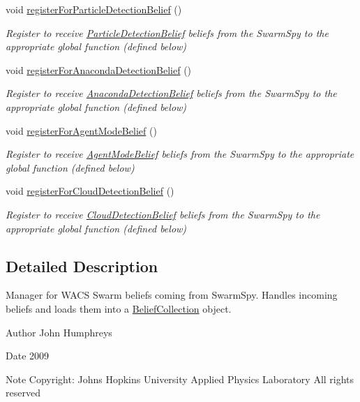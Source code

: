 \begin{DoxyCompactItemize}
void \hyperlink{class_swarm_spy_handler_ad078a719f458b35687f39b3ab64f426f}{registerForParticleDetectionBelief} ()
\begin{DoxyCompactList}\small\item\em Register to receive \hyperlink{class_particle_detection_belief}{ParticleDetectionBelief} beliefs from the SwarmSpy to the appropriate global function (defined below) \end{DoxyCompactList}\item 
void \hyperlink{class_swarm_spy_handler_aae9ba5945d62803409399fe491c925fb}{registerForAnacondaDetectionBelief} ()
\begin{DoxyCompactList}\small\item\em Register to receive \hyperlink{class_anaconda_detection_belief}{AnacondaDetectionBelief} beliefs from the SwarmSpy to the appropriate global function (defined below) \end{DoxyCompactList}\item 
void \hyperlink{class_swarm_spy_handler_a3244d08deb26b669f34333ccbdd4eac3}{registerForAgentModeBelief} ()
\begin{DoxyCompactList}\small\item\em Register to receive \hyperlink{class_agent_mode_belief}{AgentModeBelief} beliefs from the SwarmSpy to the appropriate global function (defined below) \end{DoxyCompactList}\item 
void \hyperlink{class_swarm_spy_handler_a7c3066eba552e312b67398eacec99819}{registerForCloudDetectionBelief} ()
\begin{DoxyCompactList}\small\item\em Register to receive \hyperlink{class_cloud_detection_belief}{CloudDetectionBelief} beliefs from the SwarmSpy to the appropriate global function (defined below) \end{DoxyCompactList}\end{DoxyCompactItemize}


\subsection{Detailed Description}
Manager for WACS Swarm beliefs coming from SwarmSpy. Handles incoming beliefs and loads them into a \hyperlink{class_belief_collection}{BeliefCollection} object. 

\begin{DoxyAuthor}{Author}
John Humphreys 
\end{DoxyAuthor}
\begin{DoxyDate}{Date}
2009 
\end{DoxyDate}
\begin{DoxyNote}{Note}
Copyright: Johns Hopkins University Applied Physics Laboratory All rights reserved 
\end{DoxyNote}


